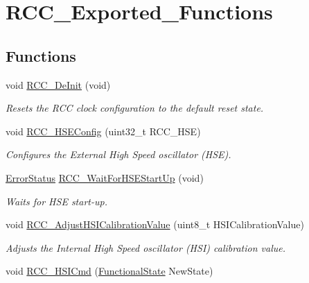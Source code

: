 \hypertarget{group___r_c_c___exported___functions}{}\section{R\+C\+C\+\_\+\+Exported\+\_\+\+Functions}
\label{group___r_c_c___exported___functions}
\subsection*{Functions}
\begin{DoxyCompactItemize}
\item 
void \mbox{\hyperlink{group___r_c_c___exported___functions_ga413f6422be11b1334abe60b3bff2e062}{R\+C\+C\+\_\+\+De\+Init}} (void)
\begin{DoxyCompactList}\small\item\em Resets the R\+CC clock configuration to the default reset state. \end{DoxyCompactList}\item 
void \mbox{\hyperlink{group___r_c_c___exported___functions_ga432b3281546d23345642d55f8670a93d}{R\+C\+C\+\_\+\+H\+S\+E\+Config}} (uint32\+\_\+t R\+C\+C\+\_\+\+H\+SE)
\begin{DoxyCompactList}\small\item\em Configures the External High Speed oscillator (H\+SE). \end{DoxyCompactList}\item 
\mbox{\hyperlink{group___exported__types_ga8333b96c67f83cba354b3407fcbb6ee8}{Error\+Status}} \mbox{\hyperlink{group___r_c_c___exported___functions_gae0f15692614dd048ee4110a056f001dc}{R\+C\+C\+\_\+\+Wait\+For\+H\+S\+E\+Start\+Up}} (void)
\begin{DoxyCompactList}\small\item\em Waits for H\+SE start-\/up. \end{DoxyCompactList}\item 
void \mbox{\hyperlink{group___r_c_c___exported___functions_gaa2d6a35f5c2e0f86317c3beb222677fc}{R\+C\+C\+\_\+\+Adjust\+H\+S\+I\+Calibration\+Value}} (uint8\+\_\+t H\+S\+I\+Calibration\+Value)
\begin{DoxyCompactList}\small\item\em Adjusts the Internal High Speed oscillator (H\+SI) calibration value. \end{DoxyCompactList}\item 
void \mbox{\hyperlink{group___r_c_c___exported___functions_ga0c6772a1e43765909495f57815ef69e2}{R\+C\+C\+\_\+\+H\+S\+I\+Cmd}} (\mbox{\hyperlink{group___exported__types_gac9a7e9a35d2513ec15c3b537aaa4fba1}{Functional\+State}} New\+State)

\end{DoxyCompactItemize}
